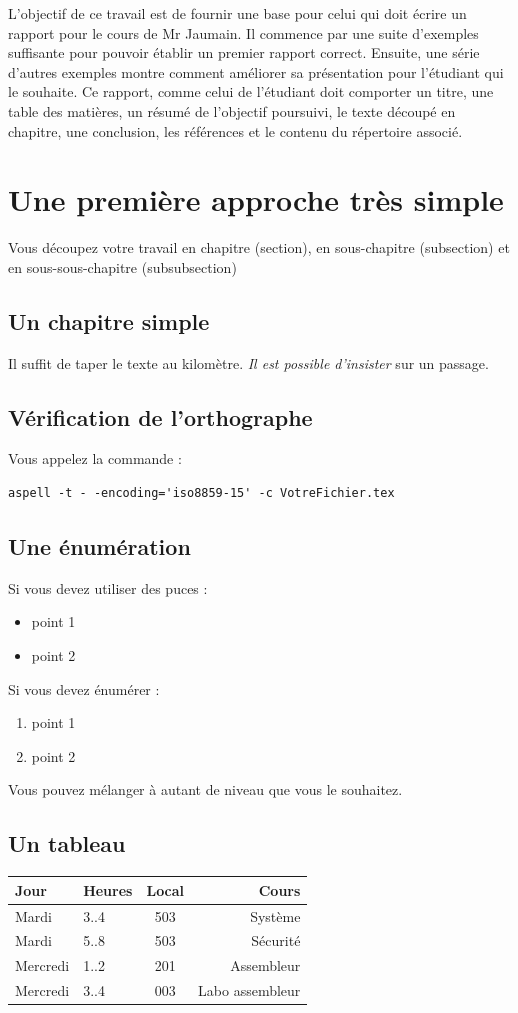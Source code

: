 L'objectif de ce travail est de fournir une base pour celui qui doit écrire un rapport pour le cours de Mr Jaumain. Il commence par une suite d'exemples suffisante pour pouvoir établir un premier rapport correct. Ensuite, une série d'autres exemples montre comment améliorer sa présentation pour l'étudiant qui le souhaite. Ce rapport, comme celui de l'étudiant doit comporter un titre, une table des matières, un résumé de l'objectif poursuivi, le texte découpé en chapitre, une conclusion, les références et le contenu du répertoire associé.  
\section {Une première approche très simple}
Vous découpez votre travail en chapitre (section), en sous-chapitre (subsection) et en sous-sous-chapitre (subsubsection)
\subsection {Un chapitre simple}
Il suffit de taper le texte au kilomètre. \emph{Il est possible d'insister} sur un passage.
\subsection {Vérification de l'orthographe}
Vous appelez la commande :
\lstset{frame=trBL}
\begin{lstlisting}
aspell -t - -encoding='iso8859-15' -c VotreFichier.tex
\end{lstlisting}
\subsection {Une énumération}
Si vous devez utiliser des puces :
\begin{itemize}
\item point 1
\item point 2
\end{itemize}
Si vous devez énumérer :
\begin{enumerate}
\item point 1
\item point 2
\end{enumerate}
Vous pouvez mélanger à autant de niveau que vous le souhaitez.
\subsection{Un tableau}
\begin{tabular}{|l|l||c||r|} %
\hline
Jour & Heures & Local & Cours \\
\hline
Mardi    &  3..4  & 503 & Système\\
Mardi    &  5..8  & 503 & Sécurité\\
\hline
Mercredi  &  1..2  &  201 & Assembleur\\
Mercredi  &  3..4  &  003 & Labo assembleur\\
\hline
\end{tabular}
